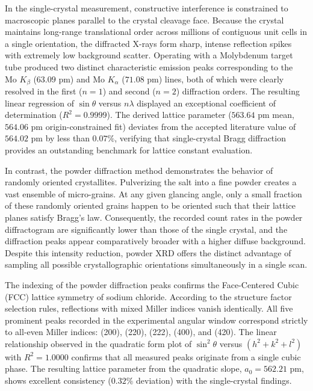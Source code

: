 \documentclass[12pt,a4paper]{article}
\begin{document}
In the single-crystal measurement, constructive interference is constrained to macroscopic planes parallel to the crystal cleavage face. Because the crystal maintains long-range translational order across millions of contiguous unit cells in a single orientation, the diffracted X-rays form sharp, intense reflection spikes with extremely low background scatter. Operating with a Molybdenum target tube produced two distinct characteristic emission peaks corresponding to the $\text{Mo } K_\beta$ ($63.09\text{ pm}$) and $\text{Mo } K_\alpha$ ($71.08\text{ pm}$) lines, both of which were clearly resolved in the first ($n=1$) and second ($n=2$) diffraction orders. The resulting linear regression of $\sin\theta$ versus $n\lambda$ displayed an exceptional coefficient of determination ($R^2 = 0.9999$). The derived lattice parameter ($563.64\text{ pm}$ mean, $564.06\text{ pm}$ origin-constrained fit) deviates from the accepted literature value of $564.02\text{ pm}$ by less than $0.07\%$, verifying that single-crystal Bragg diffraction provides an outstanding benchmark for lattice constant evaluation.

In contrast, the powder diffraction method demonstrates the behavior of randomly oriented crystallites. Pulverizing the salt into a fine powder creates a vast ensemble of micro-grains. At any given glancing angle, only a small fraction of these randomly oriented grains happen to be oriented such that their lattice planes satisfy Bragg's law. Consequently, the recorded count rates in the powder diffractogram are significantly lower than those of the single crystal, and the diffraction peaks appear comparatively broader with a higher diffuse background. Despite this intensity reduction, powder XRD offers the distinct advantage of sampling all possible crystallographic orientations simultaneously in a single scan.

The indexing of the powder diffraction peaks confirms the Face-Centered Cubic (FCC) lattice symmetry of sodium chloride. According to the structure factor selection rules, reflections with mixed Miller indices vanish identically. All five prominent peaks recorded in the experimental angular window correspond strictly to all-even Miller indices: (200), (220), (222), (400), and (420). The linear relationship observed in the quadratic form plot of $\sin^2\theta$ versus $(h^2 + k^2 + l^2)$ with $R^2 = 1.0000$ confirms that all measured peaks originate from a single cubic phase. The resulting lattice parameter from the quadratic slope, $a_0 = 562.21\text{ pm}$, shows excellent consistency ($0.32\%$ deviation) with the single-crystal findings.
\end{document}
